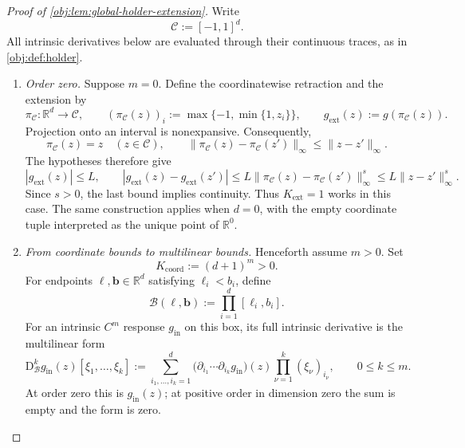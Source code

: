 \begin{proof}[Proof of \cref{obj:lem:global-holder-extension}]
Write
\[
\mathcal C:=[-1,1]^d.
\]
All intrinsic derivatives below are evaluated through their continuous traces, as in \cref{obj:def:holder}.

\begin{enumerate}
\item \emph{Order zero.}
Suppose \(m=0\). Define the coordinatewise retraction and the extension by
\[
\pi_{\mathcal C}:\mathbb R^d\longrightarrow\mathcal C,
\qquad
(\pi_{\mathcal C}(z))_i:=\max\{-1,\min\{1,z_i\}\},
\qquad
g_{\mathrm{ext}}(z):=g(\pi_{\mathcal C}(z)).
\]
Projection onto an interval is nonexpansive. Consequently,
\[
\pi_{\mathcal C}(z)=z\quad(z\in\mathcal C),
\qquad
\|\pi_{\mathcal C}(z)-\pi_{\mathcal C}(z')\|_\infty
\le \|z-z'\|_\infty.
\]
The hypotheses therefore give
\[
|g_{\mathrm{ext}}(z)|\le L,
\qquad
|g_{\mathrm{ext}}(z)-g_{\mathrm{ext}}(z')|
\le L\|\pi_{\mathcal C}(z)-\pi_{\mathcal C}(z')\|_\infty^s
\le L\|z-z'\|_\infty^s.
\]
Since \(s>0\), the last bound implies continuity. Thus \(K_{\mathrm{ext}}=1\) works in this case. The same construction applies when \(d=0\), with the empty coordinate tuple interpreted as the unique point of \(\mathbb R^0\).

\item\label{proof:global-holder-extension:coordinate-bounds} \emph{From coordinate bounds to multilinear bounds.}
Henceforth assume \(m>0\). Set
\[
K_{\mathrm{coord}}:=(d+1)^m>0.
\]
For endpoints \(\boldsymbol\ell,\boldsymbol b\in\mathbb R^d\) satisfying
\(\ell_i<b_i\), define
\[
\mathcal B(\boldsymbol\ell,\boldsymbol b)
:=\prod_{i=1}^d[\ell_i,b_i].
\]
For an intrinsic \(C^m\) response \(g_{\mathrm{in}}\) on this box, its full intrinsic derivative is the multilinear form
\[
\mathrm D_{\mathcal B}^{k}g_{\mathrm{in}}(z)
[\xi_1,\ldots,\xi_k]
:=
\sum_{i_1,\ldots,i_k=1}^d
\bigl(\partial_{i_1}\cdots\partial_{i_k}g_{\mathrm{in}}\bigr)(z)
\prod_{\nu=1}^k(\xi_\nu)_{i_\nu},
\qquad 0\le k\le m.
\]
At order zero this is \(g_{\mathrm{in}}(z)\); at positive order in dimension zero the sum is empty and the form is zero.


\end{enumerate}
\end{proof}
